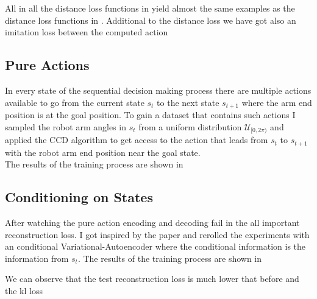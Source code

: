 All in all the distance loss functions in \figref{} yield almost the same examples as the distance loss functions in . Additional to the distance loss we have got also an imitation loss between the computed action 

\subsection{Pure Actions}

In every state of the sequential decision making process there are multiple actions available to go from the current state $s_t$ to the next state $s_{t+1}$ where the arm end position is at the goal position. To gain a dataset that contains such actions I sampled the robot arm angles in $s_t$ from a uniform distribution $\mathcal{U}_{[0, 2\pi)}$ and applied the CCD algorithm to get access to the action that leads from $s_t$ to $s_{t+1}$ with the robot arm end position near the goal state. \\

The results of the training process are shown in \figref{}

\subsection{Conditioning on States}

After watching the pure action encoding and decoding fail in the all important reconstruction loss. I got inspired by the paper  and rerolled the experiments with an conditional Variational-Autoencoder where the conditional information is the information from $s_t$. 
The results of the training process are shown in \figref{}

We can observe that the test reconstruction loss is much lower that before and the kl loss

